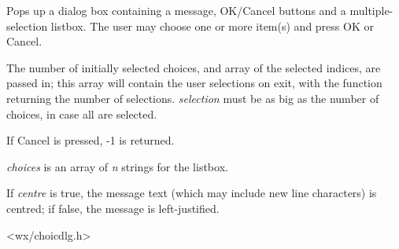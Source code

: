 
Pops up a dialog box containing a message, OK/Cancel buttons and a multiple-selection
listbox. The user may choose one or more item(s) and press OK or Cancel.

The number of initially selected choices, and array of the selected indices,
are passed in; this array will contain the user selections on exit, with
the function returning the number of selections. {\it selection} must be
as big as the number of choices, in case all are selected.

If Cancel is pressed, -1 is returned.

{\it choices} is an array of {\it n} strings for the listbox.

If {\it centre} is true, the message text (which may include new line characters)
is centred; if false, the message is left-justified.


<wx/choicdlg.h>


\label{wxgetsinglechoice}



